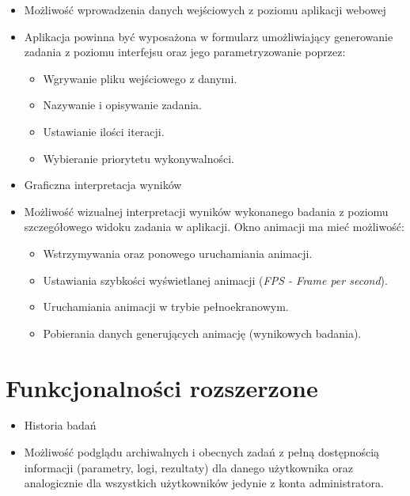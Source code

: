 \documentclass[a4paper,onecolumn,oneside,12pt]{memoir}
\begin{document}
{\begin{itemize}\bfseries
\item Możliwość wprowadzenia danych wejściowych z poziomu aplikacji webowej
\end{itemize}
\begin{itemize}
\item[] Aplikacja powinna być wyposażona w formularz umożliwiający generowanie zadania z poziomu interfejsu oraz jego parametryzowanie poprzez:
\begin{itemize}
\item Wgrywanie pliku wejściowego z danymi.
\item Nazywanie i opisywanie zadania.
\item Ustawianie ilości iteracji.
\item Wybieranie priorytetu wykonywalności.
\end{itemize}
\end{itemize}

\begin{itemize}\bfseries
\item Graficzna interpretacja wyników
\end{itemize}
\begin{itemize}
\item[] Możliwość wizualnej interpretacji wyników wykonanego badania z poziomu szczegółowego widoku zadania w aplikacji. Okno animacji ma mieć możliwość:
\begin{itemize}
\item Wstrzymywania oraz ponowego uruchamiania animacji.
\item Ustawiania szybkości wyświetlanej animacji (\textit{FPS - Frame per second}).
\item Uruchamiania animacji w trybie pełnoekranowym.
\item Pobierania danych generujących animację (wynikowych badania).
\end{itemize}
\end{itemize}

\pagebreak
\vspace*{1mm}
\section{Funkcjonalności rozszerzone}


\begin{itemize}\bfseries
\item Historia badań
\end{itemize}
\begin{itemize}
\item[] Możliwość podglądu archiwalnych i obecnych zadań z pełną dostępnością informacji (parametry, logi, rezultaty) dla danego użytkownika oraz analogicznie dla wszystkich użytkowników jedynie z konta administratora.
\end{itemize}

}
\end{document}
